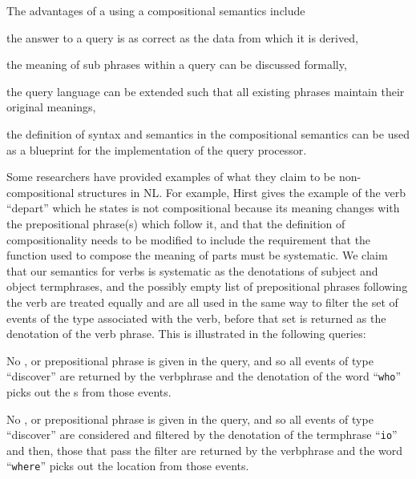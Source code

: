 \documentclass[../main.tex]{subfiles}
\begin{document}
\begin{refsection}
The advantages of a using a compositional semantics include
\begin{inparaenum}[1)]
	\item the answer to a query is as correct as the data from which it is derived,
	\item  the meaning of sub phrases within a query can be discussed formally,
	\item the query language can be extended such that all existing phrases maintain their original meanings,
	\item the definition of syntax and semantics in the compositional semantics can be used as a blueprint for the implementation of the query processor.
\end{inparaenum}

Some researchers have provided examples of what they claim to be non-compositional structures in NL. For example, Hirst \cite{hirst1992semantic} gives the example of the verb ``depart'' which he states is not compositional because its meaning changes with the prepositional phrase(s) which follow it, and that the definition of compositionality needs to be modified to include the requirement that the function used to compose the meaning of parts must be systematic. We claim that our semantics for verbs is systematic as the denotations of subject and object termphrases, and the possibly empty list of prepositional phrases following the verb are treated equally and are all used in the same way to filter the set of events of the type associated with the verb, before that set is returned as the denotation of the verb phrase. This is illustrated in the following queries:

\examplespacing


\examplespacing

\noindent No ,  or prepositional phrase is given in the query, and so all events of type ``discover'' are returned by the verbphrase and the denotation of the word ``\texttt{who}'' picks out the s from those events.

\examplespacing


\examplespacing

\noindent No , or prepositional phrase is given in the query, and so all events of type ``discover'' are considered and filtered by the denotation of the  termphrase ``\texttt{io}'' and then, those that pass the filter are returned by the verbphrase and the word ``\texttt{where}'' picks out the location from those events. %


\end{refsection}
\end{document}
